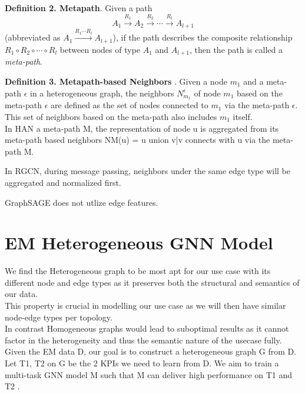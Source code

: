\documentclass{report} %
\begin{document}
\textbf{Definition 2. Metapath}. Given a path
\[
A_1 \xrightarrow{R_1} A_2 \xrightarrow{R_2} \cdots \xrightarrow{R_l} A_{l+1}
\]
(abbreviated as \( A_1 \xrightarrow{R_1 \cdots R_l} A_{l+1} \)), if the path describes the composite relationship \( R_1 \circ R_2 \circ \cdots \circ R_l \) between nodes of type \( A_1 \) and \( A_{l+1} \), then the path is called a \textit{meta-path}.


\textbf{Definition 3. Metapath-based Neighbors} . Given a node \( m_1 \) and a meta-path \( \epsilon \) in a heterogeneous graph, the neighbors \( N_{m_1}^{\epsilon} \) of node \( m_1 \) based on the meta-path \( \epsilon \) are defined as the set of nodes connected to \( m_1 \) via the meta-path \( \epsilon \). This set of neighbors based on the meta-path also includes \( m_1 \) itself.\\

In HAN a meta-path M, the representation of node u is aggregated from its meta-path based neighbors NM(u) = {u} union {v|v connects with u via the meta-path M}.

In RGCN, during message passing, neighbors under the same edge type will be aggregated and normalized first. 

GraphSAGE does not utlize edge features. \\

\cite{HGNN-2020}

\section{\ac{EM} Heterogeneous \ac{GNN} Model}\label{sec:EM Heterogeneous GNN Model}

We find the Heterogeneous graph to be most apt for our use case with its different node and edge types as it preserves both the structural and semantics of our data. \\
This property is crucial in modelling our use case as we will then have similar node-edge types per topology. \\
In contrast Homogeneous graphs would lead to suboptimal results as it cannot factor in the heterogeneity and thus the semantic nature of the usecase fully. \\

Given the \ac{EM} data D, our goal is to construct a heterogeneous graph G from D. Let T1, T2 on G be the 2 \ac{KPI}s we need to learn from D. We aim to train a multi-task \ac{GNN} model M such that M can deliver high performance on T1 and T2 .
\end{document}
